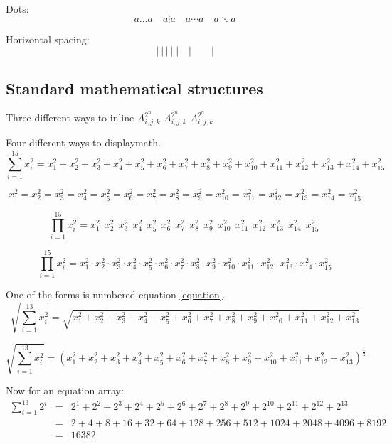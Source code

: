 \documentclass[12pt,a4paper]{article}
\begin{document}
Dots:
\begin{equation}
a \ldots a \quad a \vdots a \quad  a \cdots a \quad  a \ddots a
\end{equation}

Horizontal spacing:
\begin{equation}
|~|\,|\:|\;|\quad | \qquad |
\end{equation}

\subsection{Standard mathematical structures}

Three different ways to inline \begin{math}A_{i,j,k}^{2^n}\end{math} \(A_{i,j,k}^{2^n}\) $A_{i,j,k}^{2^n}$

Four different ways to displaymath.
\setcounter{equation}{99}
\begin{equation}\label{equation}
\sum_{i=1}^{15} x_i^2 = x_1^2 + x_2^2 + x_3^2 + x_4^2 + x_5^2 + x_6^2 + x_7^2 + x_8^2 + x_9^2 + x_{10}^2 + x_{11}^2 + x_{12}^2 + x_{13}^2 + x_{14}^2 + x_{15}^2 
\end{equation}

\begin{displaymath}
x_1^2 = x_2^2 = x_3^2 = x_4^2 = x_5^2 = x_6^2 = x_7^2 = x_8^2 = x_9^2 = x_{10}^2 = x_{11}^2 = x_{12}^2 = x_{13}^2 = x_{14}^2 = x_{15}^2 
\end{displaymath}

\[
\prod_{i=1}^{15} x_i^2 = x_1^2\ \ x_2^2\ \ x_3^2\ \ x_4^2\ \ x_5^2\ \ x_6^2\ \ x_7^2\ \ x_8^2\ \ x_9^2\ \ x_{10}^2\ \ x_{11}^2\ \ x_{12}^2\ \ x_{13}^2\ \ x_{14}^2\ \ x_{15}^2\ 
\]

$$
\prod_{i=1}^{15} x_i^2 = x_1^2 \cdot x_2^2 \cdot x_3^2 \cdot x_4^2 \cdot x_5^2 \cdot x_6^2 \cdot x_7^2 \cdot x_8^2 \cdot x_9^2 \cdot x_{10}^2 \cdot x_{11}^2 \cdot x_{12}^2 \cdot x_{13}^2 \cdot x_{14}^2 \cdot x_{15}^2 
$$

One of the forms is numbered equation \ref{equation}.
\[
\sqrt{\sum_{i=1}^{13} x_i^2} = \sqrt{x_1^2 + x_2^2 + x_3^2 + x_4^2 + x_5^2 + x_6^2 + x_7^2 + x_8^2 + x_9^2 + x_{10}^2+ x_{11}^2 + x_{12}^2 + x_{13}^2 }
\]

\[
\sqrt{\sum_{i=1}^{13} x_i^2} = \left(x_1^2 + x_2^2 + x_3^2 + x_4^2 + x_5^2 + x_6^2 + x_7^2 + x_8^2 + x_9^2 + x_{10}^2+ x_{11}^2 + x_{12}^2 + x_{13}^2 \right)^{\frac{1}{2}}
\]

Now for an equation array:
\begin{eqnarray}
\sum_{i=1}^{13} 2^i &=& 2^1 + 2^2 + 2^3 + 2^4 + 2^5 + 2^6 + 2^7 + 2^8 + 2^9 + 2^{10} + 2^{11} + 2^{12} + 2^{13}\nonumber\\
&=&2 + 4 + 8 + 16 + 32 + 64 + 128 + 256 + 512 + 1024 + 2048 + 4096 + 8192 \nonumber\\
&=&16382 
\end{eqnarray}
\end{document}
